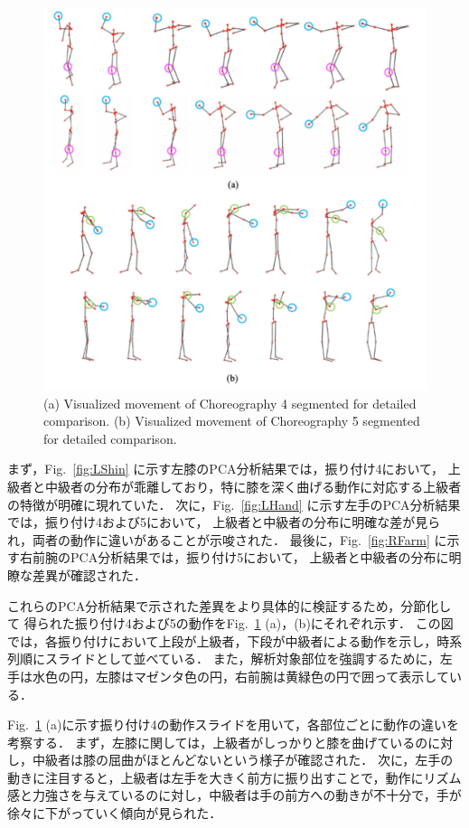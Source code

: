 \documentclass[conference]{IEEEtran}
\begin{document}
%
\begin{figure}[t]
	\centering
	\includegraphics[scale=0.3]{fig/resultmotion.pdf}
	\caption{(a) Visualized movement of Choreography 4 segmented for detailed comparison.
  (b) Visualized movement of Choreography 5 segmented for detailed comparison.}
	\label{fig:resultmotion}
	\vspace{-0.4cm}
\end{figure}
%
まず，Fig.~\ref{fig:LShin} に示す左膝のPCA分析結果では，振り付け4において，
上級者と中級者の分布が乖離しており，特に膝を深く曲げる動作に対応する上級者の特徴が明確に現れていた．
次に，Fig.~\ref{fig:LHand} に示す左手のPCA分析結果では，振り付け4および5において，
上級者と中級者の分布に明確な差が見られ，両者の動作に違いがあることが示唆された．
最後に，Fig.~\ref{fig:RFarm} に示す右前腕のPCA分析結果では，振り付け5において，
上級者と中級者の分布に明瞭な差異が確認された．

これらのPCA分析結果で示された差異をより具体的に検証するため，分節化して
得られた振り付け4および5の動作をFig.~\ref{fig:resultmotion} (a)，(b)にそれぞれ示す．
この図では，各振り付けにおいて上段が上級者，下段が中級者による動作を示し，時系列順にスライドとして並べている．
また，解析対象部位を強調するために，左手は水色の円，左膝はマゼンタ色の円，右前腕は黄緑色の円で囲って表示している．

Fig.~\ref{fig:resultmotion} (a)に示す振り付け4の動作スライドを用いて，各部位ごとに動作の違いを考察する．
まず，左膝に関しては，上級者がしっかりと膝を曲げているのに対し，中級者は膝の屈曲がほとんどないという様子が確認された．
次に，左手の動きに注目すると，上級者は左手を大きく前方に振り出すことで，動作にリズム感と力強さを与えているのに対し，中級者は手の前方への動きが不十分で，手が徐々に下がっていく傾向が見られた．
\end{document}
